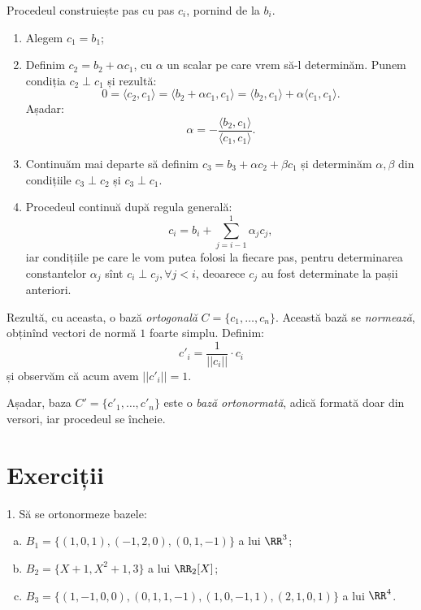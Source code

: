 Procedeul construiește pas cu pas $ c_i $, pornind de la $ b_i $.
\begin{enumerate}[(1)]
\item Alegem $ c_1 = b_1 $;
\item Definim $ c_2 = b_2 + \alpha c_1 $, cu $ \alpha $ un scalar pe care vrem
  să-l determinăm. Punem condiția $ c_2 \perp c_1 $ și rezultă:
  \[
    0 = \langle c_2, c_1 \rangle = \langle b_2 + \alpha c_1, c_1 \rangle = %
    \langle b_2, c_1 \rangle + \alpha \langle c_1, c_1 \rangle.
  \]
  Așadar:
  \[
    \alpha = - \frac{\langle b_2, c_1 \rangle}{\langle c_1, c_1 \rangle}.
  \]
\item Continuăm mai departe să definim $ c_3 = b_3 + \alpha c_2 + \beta c_1 $
  și determinăm $ \alpha, \beta $ din condițiile $ c_3 \perp c_2 $ și $ c_3 \perp c_1 $.
\item Procedeul continuă după regula generală:
  \[
    c_i = b_i + \sum_{j = i - 1}^1 \alpha_j c_j,
  \]
  iar condițiile pe care le vom putea folosi la fiecare pas, pentru determinarea
  constantelor $ \alpha_j $ sînt $ c_i \perp c_j, \forall j < i $, deoarece $ c_j $
  au fost determinate la pașii anteriori.
\end{enumerate}

Rezultă, cu aceasta, o bază \emph{ortogonală} $ C = \{ c_1, \dots, c_n \} $.
Această bază se \emph{normează}, obținînd vectori de normă $ 1 $ foarte simplu.
Definim:
\[
  c'_i = \frac{1}{||c_i||} \cdot c_i
\]
și observăm că acum avem $ ||c'_i|| = 1 $.

Așadar, baza $ C' = \{ c'_1, \dots, c'_n \} $ este o \emph{bază ortonormată},
adică formată doar din versori, iar procedeul se încheie.


\section{Exerciții}

1. Să se ortonormeze bazele:
\begin{enumerate}[(a)]
\item $ B_1 = \{ (1, 0, 1), (-1, 2, 0), (0, 1, -1) \} $ a lui $ \RR^3 $;
\item $ B_2 = \{ X + 1, X^2 + 1, 3 \} $ a lui $ \RR_2[X] $;
\item $ B_3 = \{ (1, -1, 0, 0), (0, 1, 1, -1), (1, 0, -1, 1), (2, 1, 0, 1) \} $
  a lui $ \RR^4 $.
\end{enumerate}

